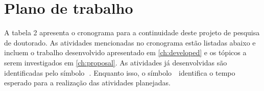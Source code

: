 




\clearpage
\section{Plano de trabalho}
\label{sec:timetable}

A tabela 2 apresenta o cronograma para a continuidade deste projeto de pesquisa de doutorado. As atividades mencionadas no cronograma estão listadas abaixo e incluem o trabalho desenvolvido apresentado em \autoref{ch:developed} e os tópicos a serem investigados em \autoref{ch:proposal}. As atividades já desenvolvidas são identificadas pelo símbolo~\,\m. Enquanto isso, o símbolo \,\x\ identifica o tempo esperado para a realização das atividades planejadas.


